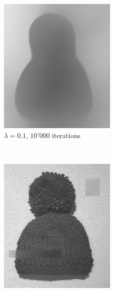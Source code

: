 \documentclass{paper}
\begin{document}
\begin{figure}[ht]
 \centering
 \begin{subfigure}[h]{0.45\textwidth}
    \centering
    \includegraphics[width=\textwidth]{hat-iter10000-lambda0_1-alpha0_001}
    \caption*{$\lambda = 0.1$, $10'000$ iterations}
 \end{subfigure}
~
 \begin{subfigure}[h]{0.45\textwidth}
    \centering
    \includegraphics[width=\textwidth]{hat-iter10000-lambda1990-alpha0_001}

\end{subfigure}
\end{figure}
\end{document}
